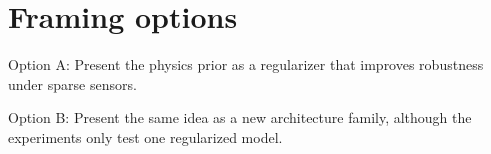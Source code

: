 \section{Framing options}
Option A: Present the physics prior as a regularizer that improves robustness under sparse sensors.

Option B: Present the same idea as a new architecture family, although the experiments only test one regularized model.
